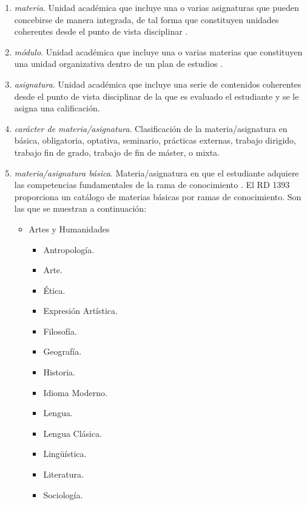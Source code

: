 \begin{enumerate}
    \item \emph{materia}. Unidad académica que incluye una o varias asignaturas que
        pueden concebirse de manera integrada, de tal forma que constituyen
        unidades coherentes desde el punto de vista disciplinar \cite[página
        33]{guiaAneca}.

    \item \emph{módulo}. Unidad académica que incluye una o varias materias que
        constituyen una unidad organizativa dentro de un plan de estudios
        \cite[página 33]{guiaAneca}.

    \item \emph{asignatura}. Unidad académica que incluye una serie de
        contenidos coherentes desde el punto de vista disciplinar de la que es
        evaluado el estudiante y se le asigna una calificación.

    \item \emph{carácter de materia/asignatura}. Clasificación de la materia/asignatura en
        básica, obligatoria, optativa, seminario, prácticas externas,
        trabajo dirigido, trabajo fin de grado, trabajo de fin de máster, o
        mixta.\cite[artículo 12, apartado 2]{rd1393} \cite[sección
        D.5]{guiaMadridMasD}

    \item \emph{materia/asignatura básica}. Materia/asignatura en que el estudiante adquiere las
        competencias fundamentales de la rama de conocimiento \cite[artículo
        12, apartado 2]{rd1393}. El RD 1393 \cite[anexo II]{rd1393} proporciona
        un catálogo de materias básicas por ramas de conocimiento. Son las que
        se muestran a continuación:

        \begin{itemize}

            \item Artes y Humanidades

                \begin{itemize}

                    \item Antropología.
                    \item Arte.
                    \item Ética.
                    \item Expresión Artística.
                    \item Filosofía.
                    \item Geografía.
                    \item Historia.
                    \item Idioma Moderno.
                    \item Lengua.
                    \item Lengua Clásica.
                    \item Lingüística.
                    \item Literatura.
                    \item Sociología.


\end{itemize}
\end{itemize}
\end{enumerate}
